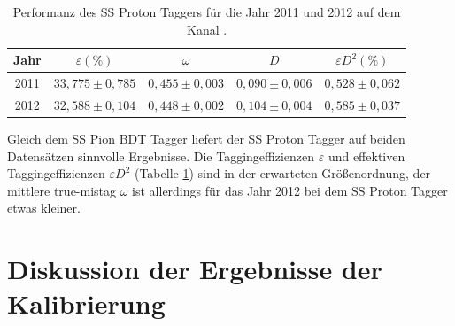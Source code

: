 \begin{table}[htbp]
	\centering
	\caption{Performanz des SS Proton Taggers für die Jahr \num{2011} und \num{2012} auf dem Kanal \BdToDpi.}
	\label{tab:performance_SSProton}
	\begin{tabular}{ccccc}
	\toprule
       Jahr & $\varepsilon(\%)$ & $\omega$ & $D$ & $\varepsilon D^2(\%)$ \\ 
       \midrule
   2011 & $33{,}775\pm0{,}785$& $0{,}455\pm0{,}003$ & $0{,}090\pm0{,}006$ & $0{,}528\pm0{,}062$\\ 
   2012 & $32{,}588\pm0{,}104$& $0{,}448\pm0{,}002$ & $0{,}104\pm0{,}004$ & $0{,}585\pm0{,}037$\\ 
   \bottomrule
	\end{tabular}
\end{table}
Gleich dem SS Pion BDT Tagger liefert der SS Proton Tagger auf beiden Datensätzen sinnvolle Ergebnisse. Die Taggingeffizienzen $\varepsilon$ und effektiven Taggingeffizienzen $\varepsilon D^2$ (Tabelle \ref{tab:performance_SSProton}) sind in der erwarteten Größenordnung, der mittlere true-mistag $\omega$ ist allerdings für das Jahr \num{2012} bei dem SS Proton Tagger etwas kleiner.

\section{Diskussion der Ergebnisse der Kalibrierung}

